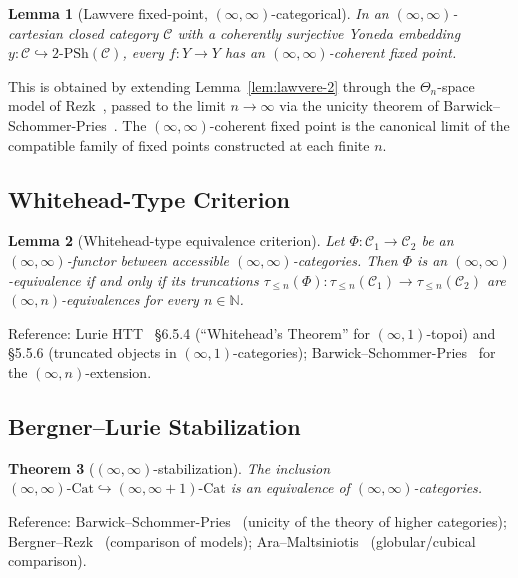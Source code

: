 \documentclass[11pt]{article}
\theoremstyle{plain}
\newtheorem{theorem}{Theorem}[section]
\newtheorem{lemma}[theorem]{Lemma}
\theoremstyle{definition}
\newcommand{\cC}{\mathcal{C}}
\newcommand{\Cat}{\mathrm{Cat}}
\begin{document}
\begin{lemma}[Lawvere fixed-point, $(\infty, \infty)$-categorical]\label{lem:lawvere-inf}
In an $(\infty, \infty)$-cartesian closed category $\cC$ with a coherently surjective Yoneda embedding $y : \cC \hookrightarrow 2\text{-}\mathrm{PSh}(\cC)$, every $f : Y \to Y$ has an $(\infty, \infty)$-coherent fixed point.
\end{lemma}

This is obtained by extending Lemma~\ref{lem:lawvere-2} through the $\Theta_n$-space model of Rezk~\cite{Rezk2010}, passed to the limit $n \to \infty$ via the unicity theorem of Barwick--Schommer-Pries~\cite{BarwickSchommerPries2021}. The $(\infty, \infty)$-coherent fixed point is the canonical limit of the compatible family of fixed points constructed at each finite $n$.

\subsection{Whitehead-Type Criterion}

\begin{lemma}[Whitehead-type equivalence criterion]\label{lem:whitehead}
Let $\Phi : \cC_1 \to \cC_2$ be an $(\infty, \infty)$-functor between accessible $(\infty, \infty)$-categories. Then $\Phi$ is an $(\infty, \infty)$-equivalence if and only if its truncations $\tau_{\leq n}(\Phi) : \tau_{\leq n}(\cC_1) \to \tau_{\leq n}(\cC_2)$ are $(\infty, n)$-equivalences for every $n \in \mathbb{N}$.
\end{lemma}

Reference: Lurie HTT~\cite{LurieHTT} \S 6.5.4 (``Whitehead's Theorem'' for $(\infty, 1)$-topoi) and \S 5.5.6 (truncated objects in $(\infty, 1)$-categories); Barwick--Schommer-Pries~\cite{BarwickSchommerPries2021} for the $(\infty, n)$-extension.

\subsection{Bergner--Lurie Stabilization}

\begin{theorem}[$(\infty, \infty)$-stabilization]\label{thm:bergner-lurie-stab}
The inclusion $(\infty, \infty)\text{-}\Cat \hookrightarrow (\infty, \infty + 1)\text{-}\Cat$ is an equivalence of $(\infty, \infty)$-categories.
\end{theorem}

Reference: Barwick--Schommer-Pries~\cite{BarwickSchommerPries2021} (unicity of the theory of higher categories); Bergner--Rezk~\cite{BergnerRezk2013} (comparison of models); Ara--Maltsiniotis~\cite{AraMaltsiniotis2017} (globular/cubical comparison).
\end{document}
